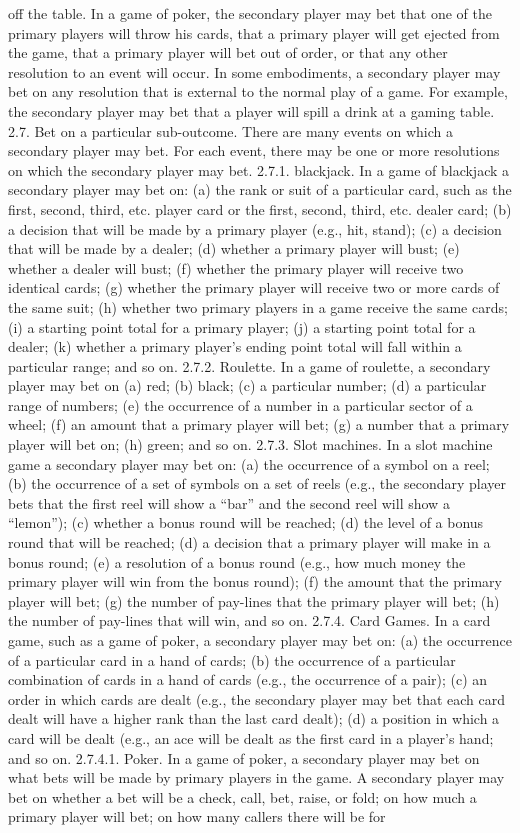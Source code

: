 \documentclass[11pt,a4paper]{article}
\begin{document}
off the table. In a game of poker, the secondary player may bet that one of the primary players will throw his cards, that a primary player will get ejected from the game, that a primary player will bet out of order, or that any other resolution to an event will occur. In some embodiments, a secondary player may bet on any resolution that is external to the normal play of a game. For example, the secondary player may bet that a player will spill a drink at a gaming table. 2.7. Bet on a particular sub-outcome. There are many events on which a secondary player may bet. For each event, there may be one or more resolutions on which the secondary player may bet. 2.7.1. blackjack. In a game of blackjack a secondary player may bet on: (a) the rank or suit of a particular card, such as the first, second, third, etc. player card or the first, second, third, etc. dealer card; (b) a decision that will be made by a primary player (e.g., hit, stand); (c) a decision that will be made by a dealer; (d) whether a primary player will bust; (e) whether a dealer will bust; (f) whether the primary player will receive two identical cards; (g) whether the primary player will receive two or more cards of the same suit; (h) whether two primary players in a game receive the same cards; (i) a starting point total for a primary player; (j) a starting point total for a dealer; (k) whether a primary player's ending point total will fall within a particular range; and so on. 2.7.2. Roulette. In a game of roulette, a secondary player may bet on (a) red; (b) black; (c) a particular number; (d) a particular range of numbers; (e) the occurrence of a number in a particular sector of a wheel; (f) an amount that a primary player will bet; (g) a number that a primary player will bet on; (h) green; and so on. 2.7.3. Slot machines. In a slot machine game a secondary player may bet on: (a) the occurrence of a symbol on a reel; (b) the occurrence of a set of symbols on a set of reels (e.g., the secondary player bets that the first reel will show a “bar” and the second reel will show a “lemon”); (c) whether a bonus round will be reached; (d) the level of a bonus round that will be reached; (d) a decision that a primary player will make in a bonus round; (e) a resolution of a bonus round (e.g., how much money the primary player will win from the bonus round); (f) the amount that the primary player will bet; (g) the number of pay-lines that the primary player will bet; (h) the number of pay-lines that will win, and so on. 2.7.4. Card Games. In a card game, such as a game of poker, a secondary player may bet on: (a) the occurrence of a particular card in a hand of cards; (b) the occurrence of a particular combination of cards in a hand of cards (e.g., the occurrence of a pair); (c) an order in which cards are dealt (e.g., the secondary player may bet that each card dealt will have a higher rank than the last card dealt); (d) a position in which a card will be dealt (e.g., an ace will be dealt as the first card in a player's hand; and so on. 2.7.4.1. Poker. In a game of poker, a secondary player may bet on what bets will be made by primary players in the game. A secondary player may bet on whether a bet will be a check, call, bet, raise, or fold; on how much a primary player will bet; on how many callers there will be for 
\end{document}

